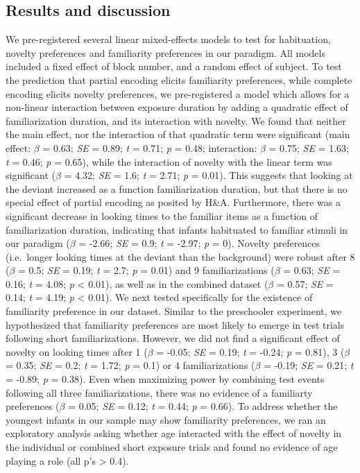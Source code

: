\documentclass[10pt, letterpaper]{article}
\begin{document}
\hypertarget{results-and-discussion-1}{%
\subsection{Results and discussion}\label{results-and-discussion-1}}

We pre-registered several linear mixed-effects models to test for
habituation, novelty preferences and familiarity preferences in our
paradigm. All models included a fixed effect of block number, and a
random effect of subject. To test the prediction that partial encoding
elicits familiarity preferences, while complete encoding elicits novelty
preferences, we pre-registered a model which allows for a non-linear
interaction between exposure duration by adding a quadratic effect of
familiarization duration, and its interaction with novelty. We found
that neither the main effect, nor the interaction of that quadratic term
were significant (main effect: \(\beta\) = 0.63; \emph{SE} = 0.89;
\emph{t} = 0.71; \emph{p} = 0.48; interaction: \(\beta\) = 0.75;
\emph{SE} = 1.63; \emph{t} = 0.46; \emph{p} = 0.65), while the
interaction of novelty with the linear term was significant (\(\beta\) =
4.32; \emph{SE} = 1.6; \emph{t} = 2.71; \emph{p} = 0.01). This suggests
that looking at the deviant increased as a function familiarization
duration, but that there is no special effect of partial encoding as
posited by H\&A. Furthermore, there was a significant decrease in
looking times to the familiar items as a function of familiarization
duration, indicating that infants habituated to familiar stimuli in our
paradigm (\(\beta\) = -2.66; \emph{SE} = 0.9; \emph{t} = -2.97; \emph{p}
= 0). Novelty preferences (i.e.~longer looking times at the deviant than
the background) were robust after 8 (\(\beta\) = 0.5; \emph{SE} = 0.19;
\emph{t} = 2.7; \emph{p} = 0.01) and 9 familiarizations (\(\beta\) =
0.63; \emph{SE} = 0.16; \emph{t} = 4.08; \emph{p} \textless{} 0.01), as
well as in the combined dataset (\(\beta\) = 0.57; \emph{SE} = 0.14;
\emph{t} = 4.19; \emph{p} \textless{} 0.01). We next tested specifically
for the existence of familiarity preference in our dataset. Similar to
the preschooler experiment, we hypothesized that familiarity preferences
are most likely to emerge in test trials following short
familiarizations. However, we did not find a significant effect of
novelty on looking times after 1 (\(\beta\) = -0.05; \emph{SE} = 0.19;
\emph{t} = -0.24; \emph{p} = 0.81), 3 (\(\beta\) = 0.35; \emph{SE} =
0.2; \emph{t} = 1.72; \emph{p} = 0.1) or 4 familiarizations (\(\beta\) =
-0.19; \emph{SE} = 0.21; \emph{t} = -0.89; \emph{p} = 0.38). Even when
maximizing power by combining test events following all three
familiarizations, there was no evidence of a familiarty preferences
(\(\beta\) = 0.05; \emph{SE} = 0.12; \emph{t} = 0.44; \emph{p} = 0.66).
To address whether the youngest infants in our sample may show
familiarity preferences, we ran an exploratory analysis asking whether
age interacted with the effect of novelty in the individual or combined
short exposure trials and found no evidence of age playing a role (all
p's \textgreater{} 0.4).
\end{document}
